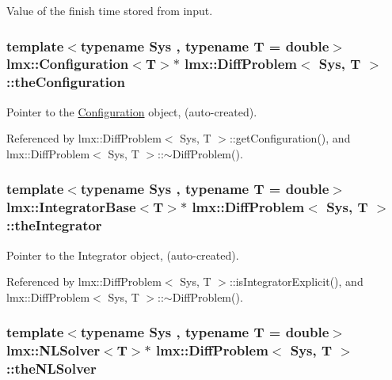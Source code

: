 Value of the finish time stored from input. 

\hypertarget{classlmx_1_1DiffProblem_a714d81c35c9c8648817dcd58f78d7f66}{
\subsubsection[{the\-Configuration}]{\setlength{\rightskip}{0pt plus 5cm}template$<$typename Sys , typename T  = double$>$ {\bf lmx\-::\-Configuration}$<$T$>$$\ast$ {\bf lmx\-::\-Diff\-Problem}$<$ Sys, T $>$\-::the\-Configuration\hspace{0.3cm}{\ttfamily [protected]}}}\label{classlmx_1_1DiffProblem_a714d81c35c9c8648817dcd58f78d7f66}


Pointer to the \hyperlink{classlmx_1_1Configuration}{Configuration} object, (auto-\/created). 



Referenced by lmx\-::\-Diff\-Problem$<$ Sys, T $>$\-::get\-Configuration(), and lmx\-::\-Diff\-Problem$<$ Sys, T $>$\-::$\sim$\-Diff\-Problem().

\hypertarget{classlmx_1_1DiffProblem_a5dceac9c803cae5b920048f40f9b889e}{
\subsubsection[{the\-Integrator}]{\setlength{\rightskip}{0pt plus 5cm}template$<$typename Sys , typename T  = double$>$ {\bf lmx\-::\-Integrator\-Base}$<$T$>$$\ast$ {\bf lmx\-::\-Diff\-Problem}$<$ Sys, T $>$\-::the\-Integrator\hspace{0.3cm}{\ttfamily [protected]}}}\label{classlmx_1_1DiffProblem_a5dceac9c803cae5b920048f40f9b889e}


Pointer to the Integrator object, (auto-\/created). 



Referenced by lmx\-::\-Diff\-Problem$<$ Sys, T $>$\-::is\-Integrator\-Explicit(), and lmx\-::\-Diff\-Problem$<$ Sys, T $>$\-::$\sim$\-Diff\-Problem().

\hypertarget{classlmx_1_1DiffProblem_ae6dc037dd9bd8d81235c9ac17d5c6c1a}{
\subsubsection[{the\-N\-L\-Solver}]{\setlength{\rightskip}{0pt plus 5cm}template$<$typename Sys , typename T  = double$>$ {\bf lmx\-::\-N\-L\-Solver}$<$T$>$$\ast$ {\bf lmx\-::\-Diff\-Problem}$<$ Sys, T $>$\-::the\-N\-L\-Solver\hspace{0.3cm}{\ttfamily [protected]}}}\label{classlmx_1_1DiffProblem_ae6dc037dd9bd8d81235c9ac17d5c6c1a}


